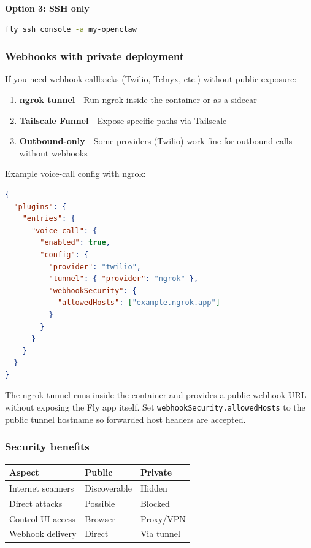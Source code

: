 \textbf{Option 3: SSH only}

\begin{lstlisting}[language=bash]
fly ssh console -a my-openclaw
\end{lstlisting}


\subsubsection{Webhooks with private deployment}


If you need webhook callbacks (Twilio, Telnyx, etc.) without public exposure:

\begin{enumerate}
  \item \textbf{ngrok tunnel} - Run ngrok inside the container or as a sidecar
  \item \textbf{Tailscale Funnel} - Expose specific paths via Tailscale
  \item \textbf{Outbound-only} - Some providers (Twilio) work fine for outbound calls without webhooks
\end{enumerate}


Example voice-call config with ngrok:

\begin{lstlisting}[language=json]
{
  "plugins": {
    "entries": {
      "voice-call": {
        "enabled": true,
        "config": {
          "provider": "twilio",
          "tunnel": { "provider": "ngrok" },
          "webhookSecurity": {
            "allowedHosts": ["example.ngrok.app"]
          }
        }
      }
    }
  }
}
\end{lstlisting}


The ngrok tunnel runs inside the container and provides a public webhook URL without exposing the Fly app itself. Set \texttt{webhookSecurity.allowedHosts} to the public tunnel hostname so forwarded host headers are accepted.

\subsubsection{Security benefits}



\begin{table}[h]
\centering
\small
\begin{tabular}{|l|l|l|}
\hline
Aspect & Public & Private \\
\hline
Internet scanners & Discoverable & Hidden \\
\hline
Direct attacks & Possible & Blocked \\
\hline
Control UI access & Browser & Proxy/VPN \\
\hline
Webhook delivery & Direct & Via tunnel \\
\hline
\end{tabular}
\end{table}



